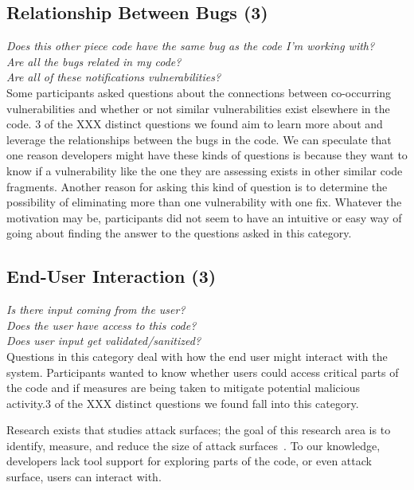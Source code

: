 \documentclass[conference]{IEEEtran}
\begin{document}

\noindent\subsection{\textbf{Relationship Between Bugs (3)}}

\noindent\emph{Does this other piece code have the same bug as the code I'm working with?} \\
\emph{Are all the bugs related in my code?} \\
\emph{Are all of these notifications vulnerabilities?} \\

Some participants asked questions about the connections between co-occurring vulnerabilities and whether or not similar vulnerabilities exist elsewhere in the code. 3 of the XXX distinct questions we found aim to learn more about and leverage the relationships between the bugs in the code. We can speculate that one reason developers might have these kinds of questions is because they want to know if a vulnerability like the one they are assessing exists in other similar code fragments. Another reason for asking this kind of question is to determine the possibility of eliminating more than one vulnerability with one fix. Whatever the motivation may be, participants did not seem to have an intuitive or easy way of going about finding the answer to the questions asked in this category. 


\noindent\subsection{\textbf{End-User Interaction (3)}}

\noindent\emph{Is there input coming from the user?} \\
\emph{Does the user have access to this code?} \\
\emph{Does user input get validated/sanitized?} \\

Questions in this category deal with how the end user might interact with the system. Participants wanted to know whether users could access critical parts of the code and if measures are being taken to mitigate potential malicious activity.3 of the XXX distinct questions we found fall into this category. 

Research exists that studies attack surfaces; the goal of this research area is to identify, measure, and reduce the size of attack surfaces~\cite{manadhata2011attack, bartel2012automatically}. To our knowledge, developers lack tool support for exploring parts of the code, or even attack surface, users can interact with. 
\end{document}
